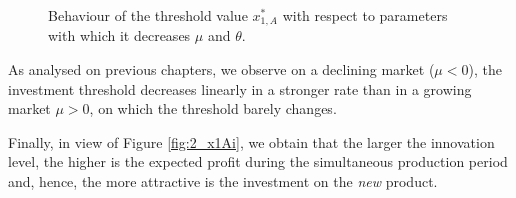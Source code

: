 \begin{figure}[!htb]
	\begin{subfigmatrix}{2}
	\end{subfigmatrix}
	\caption{Behaviour of the threshold value $x^*_{1,A}$ with respect to parameters with which it decreases $\mu$ and $\theta$.}
	\label{fig:2_x1Ad}
\end{figure}


As analysed on previous chapters, we observe on a declining market ($\mu<0$), the investment threshold decreases linearly in a stronger rate than in a growing market $\mu>0$, on which the threshold barely changes.
 
Finally, in view of Figure \ref{fig:2_x1Ai}, we obtain that the larger the innovation level, the higher is the expected profit during the simultaneous production period and, hence, the more attractive is the investment on the \textit{new} product.






